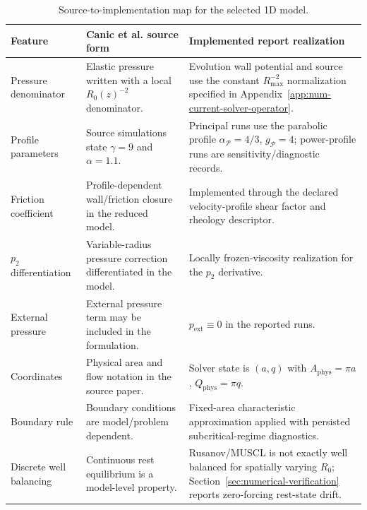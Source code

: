 \begin{table}[!htb]
    \centering
    \scriptsize
    \caption{Source-to-implementation map for the selected 1D model.}
    \label{tab:source-to-implementation-model}
    \begin{tabularx}{\textwidth}{@{}
        >{\raggedright\arraybackslash}p{}
        >{\raggedright\arraybackslash}p{}
        >{\raggedright\arraybackslash}X@{}}
        \toprule
        \textbf{Feature} & \textbf{Canic et al. source form} & \textbf{Implemented report realization} \\
        \midrule
        Pressure denominator
            & Elastic pressure written with a local $R_0(z)^{-2}$ denominator.
            & Evolution wall potential and source use the constant
            $R_{\max}^{-2}$ normalization specified in
            Appendix~\ref{app:num-current-solver-operator}. \\
        Profile parameters
            & Source simulations state $\gamma=9$ and $\alpha=1.1$.
            & Principal runs use the parabolic profile
            $\alpha_{\mathcal P}=4/3$, $g_{\mathcal P}=4$; power-profile runs
            are sensitivity/diagnostic records. \\
        Friction coefficient
            & Profile-dependent wall/friction closure in the reduced model.
            & Implemented through the declared velocity-profile shear factor
            and rheology descriptor. \\
        $p_2$ differentiation
            & Variable-radius pressure correction differentiated in the model.
            & Locally frozen-viscosity realization for the $p_2$ derivative. \\
        External pressure
            & External pressure term may be included in the formulation.
            & $p_{\mathrm{ext}}\equiv0$ in the reported runs. \\
        Coordinates
            & Physical area and flow notation in the source paper.
            & Solver state is $(a,q)$ with
            $A_{\mathrm{phys}}=\pi a$, $Q_{\mathrm{phys}}=\pi q$. \\
        Boundary rule
            & Boundary conditions are model/problem dependent.
            & Fixed-area characteristic approximation applied with persisted
            subcritical-regime diagnostics. \\
        Discrete well balancing
            & Continuous rest equilibrium is a model-level property.
            & Rusanov/MUSCL is not exactly well balanced for spatially varying
            $R_0$; Section~\ref{sec:numerical-verification} reports
            zero-forcing rest-state drift. \\
        \bottomrule
    \end{tabularx}
\end{table}

